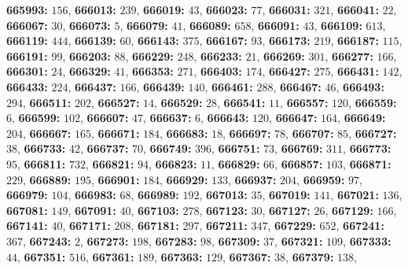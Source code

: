 \textsf{\bfseries 665993:} $156$, \textsf{\bfseries 666013:} $239$, \textsf{\bfseries 666019:} $43$, \textsf{\bfseries 666023:} $77$, \textsf{\bfseries 666031:} $321$, \textsf{\bfseries 666041:} $22$, \textsf{\bfseries 666067:} $30$, \textsf{\bfseries 666073:} $5$, \textsf{\bfseries 666079:} $41$, \textsf{\bfseries 666089:} $658$, \textsf{\bfseries 666091:} $43$, \textsf{\bfseries 666109:} $613$, \textsf{\bfseries 666119:} $444$, \textsf{\bfseries 666139:} $60$, \textsf{\bfseries 666143:} $375$, \textsf{\bfseries 666167:} $93$, \textsf{\bfseries 666173:} $219$, \textsf{\bfseries 666187:} $115$, \textsf{\bfseries 666191:} $99$, \textsf{\bfseries 666203:} $88$, \textsf{\bfseries 666229:} $248$, \textsf{\bfseries 666233:} $21$, \textsf{\bfseries 666269:} $301$, \textsf{\bfseries 666277:} $166$, \textsf{\bfseries 666301:} $24$, \textsf{\bfseries 666329:} $41$, \textsf{\bfseries 666353:} $271$, \textsf{\bfseries 666403:} $174$, \textsf{\bfseries 666427:} $275$, \textsf{\bfseries 666431:} $142$, \textsf{\bfseries 666433:} $224$, \textsf{\bfseries 666437:} $166$, \textsf{\bfseries 666439:} $140$, \textsf{\bfseries 666461:} $288$, \textsf{\bfseries 666467:} $46$, \textsf{\bfseries 666493:} $294$, \textsf{\bfseries 666511:} $202$, \textsf{\bfseries 666527:} $14$, \textsf{\bfseries 666529:} $28$, \textsf{\bfseries 666541:} $11$, \textsf{\bfseries 666557:} $120$, \textsf{\bfseries 666559:} $6$, \textsf{\bfseries 666599:} $102$, \textsf{\bfseries 666607:} $47$, \textsf{\bfseries 666637:} $6$, \textsf{\bfseries 666643:} $120$, \textsf{\bfseries 666647:} $164$, \textsf{\bfseries 666649:} $204$, \textsf{\bfseries 666667:} $165$, \textsf{\bfseries 666671:} $184$, \textsf{\bfseries 666683:} $18$, \textsf{\bfseries 666697:} $78$, \textsf{\bfseries 666707:} $85$, \textsf{\bfseries 666727:} $38$, \textsf{\bfseries 666733:} $42$, \textsf{\bfseries 666737:} $70$, \textsf{\bfseries 666749:} $396$, \textsf{\bfseries 666751:} $73$, \textsf{\bfseries 666769:} $311$, \textsf{\bfseries 666773:} $95$, \textsf{\bfseries 666811:} $732$, \textsf{\bfseries 666821:} $94$, \textsf{\bfseries 666823:} $11$, \textsf{\bfseries 666829:} $66$, \textsf{\bfseries 666857:} $103$, \textsf{\bfseries 666871:} $229$, \textsf{\bfseries 666889:} $195$, \textsf{\bfseries 666901:} $184$, \textsf{\bfseries 666929:} $133$, \textsf{\bfseries 666937:} $204$, \textsf{\bfseries 666959:} $97$, \textsf{\bfseries 666979:} $104$, \textsf{\bfseries 666983:} $68$, \textsf{\bfseries 666989:} $192$, \textsf{\bfseries 667013:} $35$, \textsf{\bfseries 667019:} $141$, \textsf{\bfseries 667021:} $136$, \textsf{\bfseries 667081:} $149$, \textsf{\bfseries 667091:} $40$, \textsf{\bfseries 667103:} $278$, \textsf{\bfseries 667123:} $30$, \textsf{\bfseries 667127:} $26$, \textsf{\bfseries 667129:} $166$, \textsf{\bfseries 667141:} $40$, \textsf{\bfseries 667171:} $208$, \textsf{\bfseries 667181:} $297$, \textsf{\bfseries 667211:} $347$, \textsf{\bfseries 667229:} $652$, \textsf{\bfseries 667241:} $367$, \textsf{\bfseries 667243:} $2$, \textsf{\bfseries 667273:} $198$, \textsf{\bfseries 667283:} $98$, \textsf{\bfseries 667309:} $37$, \textsf{\bfseries 667321:} $109$, \textsf{\bfseries 667333:} $44$, \textsf{\bfseries 667351:} $516$, \textsf{\bfseries 667361:} $189$, \textsf{\bfseries 667363:} $129$, \textsf{\bfseries 667367:} $38$, \textsf{\bfseries 667379:} $138$, 
